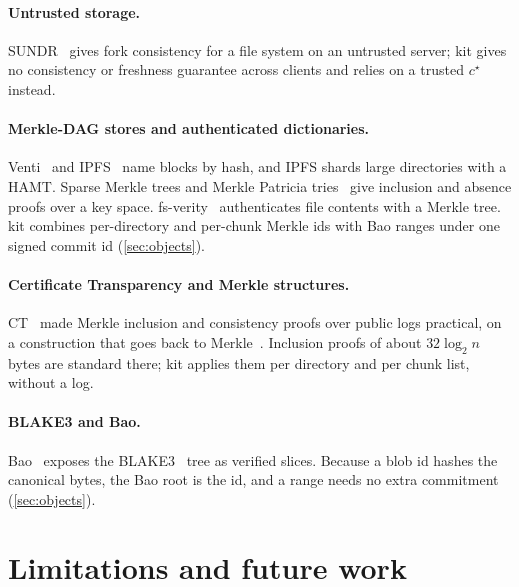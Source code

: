 \documentclass[10pt,letterpaper]{article}
\theoremstyle{remark}
\newcommand{\kit}{\textsf{kit}}
\begin{document}
\paragraph{Untrusted storage.} SUNDR~\cite{sundr} gives fork consistency for a
file system on an untrusted server; \kit{} gives no consistency or freshness
guarantee across clients and relies on a trusted $c^\star$ instead.

\paragraph{Merkle-DAG stores and authenticated dictionaries.}
Venti~\cite{venti} and IPFS~\cite{unixfs} name blocks by hash, and IPFS shards
large directories with a HAMT. Sparse Merkle trees and Merkle Patricia
tries~\cite{smt,ethereum} give inclusion and absence proofs over a key space.
fs-verity~\cite{fsverity} authenticates file contents with a Merkle tree.
\kit{} combines per-directory and per-chunk Merkle ids with Bao ranges under
one signed commit id (\cref{sec:objects}).

\paragraph{Certificate Transparency and Merkle structures.} CT~\cite{rfc6962}
made Merkle inclusion and consistency proofs over public logs practical, on a
construction that goes back to Merkle~\cite{merkle1987}. Inclusion proofs of
about $32\log_2 n$ bytes are standard there; \kit{} applies them per directory
and per chunk list, without a log.

\paragraph{BLAKE3 and Bao.} Bao~\cite{bao} exposes the BLAKE3~\cite{blake3}
tree as verified slices. Because a blob id hashes the canonical bytes, the Bao
root is the id, and a range needs no extra commitment (\cref{sec:objects}).

\section{Limitations and future work}\label{sec:limits}
\end{document}
